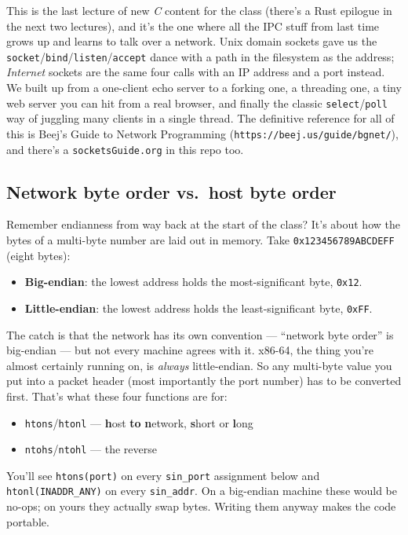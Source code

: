 \documentclass[11pt]{article}
\begin{document}
This is the last lecture of new \emph{C} content for the class (there's
a Rust epilogue in the next two lectures), and it's the
one where all the IPC stuff from last time grows up and learns to
talk over a network. Unix domain sockets gave us the
\texttt{socket}/\texttt{bind}/\texttt{listen}/\texttt{accept} dance
with a path in the filesystem as the address; \emph{Internet}
sockets are the same four calls with an IP address and a port
instead. We built up from a one-client echo server to a forking
one, a threading one, a tiny web server you can hit from a real
browser, and finally the classic \texttt{select}/\texttt{poll} way
of juggling many clients in a single thread. The definitive
reference for all of this is Beej's Guide to Network Programming
(\texttt{https://beej.us/guide/bgnet/}), and there's a
\texttt{socketsGuide.org} in this repo too.

\subsection*{Network byte order vs.\ host byte order}

Remember endianness from way back at the start of the class? It's
about how the bytes of a multi-byte number are laid out in memory.
Take \texttt{0x123456789ABCDEFF} (eight bytes):
\begin{itemize}
  \item \textbf{Big-endian}: the lowest address holds the
    most-significant byte, \texttt{0x12}.
  \item \textbf{Little-endian}: the lowest address holds the
    least-significant byte, \texttt{0xFF}.
\end{itemize}

The catch is that the network has its own convention --- ``network
byte order'' is big-endian --- but not every machine agrees with it.
x86-64, the thing you're almost certainly running on, is
\emph{always} little-endian. So any multi-byte value you put into a
packet header (most importantly the port number) has to be converted
first. That's what these four functions are for:
\begin{itemize}
  \item \texttt{htons}/\texttt{htonl} --- \textbf{h}ost \textbf{to}
    \textbf{n}etwork, \textbf{s}hort or \textbf{l}ong
  \item \texttt{ntohs}/\texttt{ntohl} --- the reverse
\end{itemize}
You'll see \texttt{htons(port)} on every \texttt{sin\_port}
assignment below and \texttt{htonl(INADDR\_ANY)} on every
\texttt{sin\_addr}. On a big-endian machine these would be no-ops; on
yours they actually swap bytes. Writing them anyway makes
the code portable.
\end{document}

